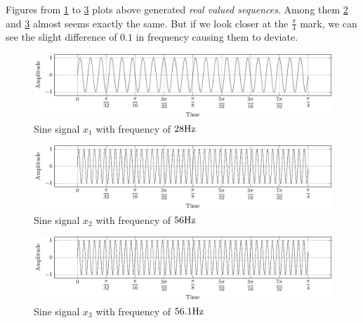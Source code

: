 \documentclass[../../course]{subfiles}
\begin{document}
Figures from \ref{plt:seqx1} to \ref{plt:seqx3} plots above generated \emph{real valued sequences}.
Among them \ref{plt:seqx2} and \ref{plt:seqx3} almost seems exactly the same. But if we look
closer at the $\frac{\pi}{4}$ mark, we can see the slight difference of $0.1$ in frequency causing them
to deviate.

\begin{figure} [H]
    \centering
     {
        \includegraphics[height = 0.8\textheight] {tikzpics/plotSeqX1.pdf}
    }
     {Sine signal $x_{1}$ with frequency of $\freqXOne \si{Hz}$}
    \label{plt:seqx1}
\end{figure}

\begin{figure} [H]
    \centering
     {
        \includegraphics[height = 0.8\textheight] {tikzpics/plotSeqX2.pdf}
    }
     {Sine signal $x_{2}$ with frequency of $\freqXTwo \si{Hz}$}
    \label{plt:seqx2}
\end{figure}

\begin{figure} [H]
    \centering
     {
        \includegraphics[height = 0.8\textheight] {tikzpics/plotSeqX3.pdf}
    }
     {Sine signal $x_{3}$ with frequency of $\freqXThree \si{Hz}$}
    \label{plt:seqx3}
\end{figure}
\end{document}

